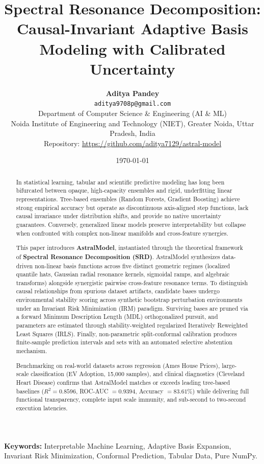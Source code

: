 \documentclass[11pt,a4paper]{article}
\title{\textbf{Spectral Resonance Decomposition: Causal-Invariant Adaptive Basis Modeling with Calibrated Uncertainty}}
\author{
  \textbf{Aditya Pandey} \\
  \texttt{aditya9708p@gmail.com} \\
  \small Department of Computer Science \& Engineering (AI \& ML) \\
  \small Noida Institute of Engineering and Technology (NIET), Greater Noida, Uttar Pradesh, India \\
  \small Repository: \url{https://github.com/aditya7129/astral-model}
}
\date{\today}
\begin{document}
\maketitle

\begin{abstract}
In statistical learning, tabular and scientific predictive modeling has long been bifurcated between opaque, high-capacity ensembles and rigid, underfitting linear representations. Tree-based ensembles (Random Forests, Gradient Boosting) achieve strong empirical accuracy but operate as discontinuous axis-aligned step functions, lack causal invariance under distribution shifts, and provide no native uncertainty guarantees. Conversely, generalized linear models preserve interpretability but collapse when confronted with complex non-linear manifolds and cross-feature synergies.

This paper introduces \textbf{AstralModel}, instantiated through the theoretical framework of \textbf{Spectral Resonance Decomposition (SRD)}. AstralModel synthesizes data-driven non-linear basis functions across five distinct geometric regimes (localized quantile hats, Gaussian radial resonance kernels, sigmoidal ramps, and algebraic transforms) alongside synergistic pairwise cross-feature resonance terms. To distinguish causal relationships from spurious dataset artifacts, candidate bases undergo environmental stability scoring across synthetic bootstrap perturbation environments under an Invariant Risk Minimization (IRM) paradigm. Surviving bases are pruned via a forward Minimum Description Length (MDL) orthogonalized pursuit, and parameters are estimated through stability-weighted regularized Iteratively Reweighted Least Squares (IRLS). Finally, non-parametric split-conformal calibration produces finite-sample prediction intervals and sets with an automated selective abstention mechanism.

Benchmarking on real-world datasets across regression (Ames House Prices), large-scale classification (EV Adoption, 15,000 samples), and clinical diagnostics (Cleveland Heart Disease) confirms that AstralModel matches or exceeds leading tree-based baselines ($R^2 = 0.8596$, ROC-AUC $= 0.9394$, Accuracy $= 83.61\%$) while delivering full functional transparency, complete input scale immunity, and sub-second to two-second execution latencies.
\end{abstract}

\vspace{0.5em}
\noindent\textbf{Keywords:} Interpretable Machine Learning, Adaptive Basis Expansion, Invariant Risk Minimization, Conformal Prediction, Tabular Data, Pure NumPy.
\end{document}
